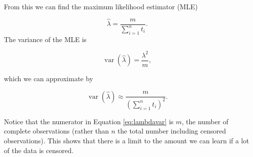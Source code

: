 \documentclass[
  openany]{book}
\theoremstyle{definition}
\theoremstyle{definition}
\theoremstyle{definition}
\theoremstyle{definition}
\theoremstyle{remark}
\begin{document}
From this we can find the maximum likelihood estimator (MLE)

\[\hat{\lambda} = \frac{m}{\sum\limits_{i=1}^n t_i}.\]
The variance of the MLE is

\begin{equation}
\operatorname{var}\left(\hat\lambda\right) = \frac{\lambda^2}{m},
\label{eq:lambdavar}
\end{equation}

which we can approximate by

\[\operatorname{var}\left(\hat\lambda\right) \approx \frac{m}{\left(\sum\limits_{i=1}^n t_i\right)^2}.\]

Notice that the numerator in Equation \eqref{eq:lambdavar} is \(m\), the number of complete observations (rather than \(n\) the total number including censored observations). This shows that there is a limit to the amount we can learn if a lot of the data is censored.
\end{document}
